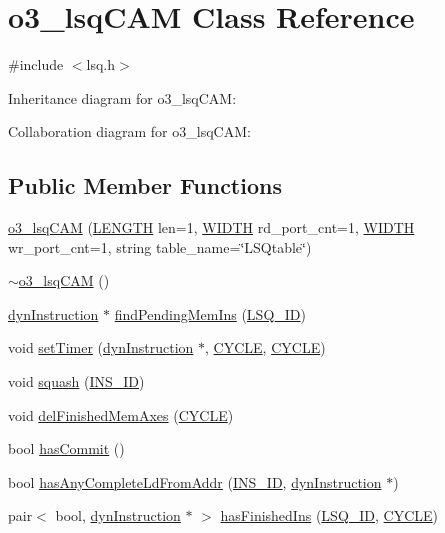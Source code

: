 \hypertarget{classo3__lsqCAM}{
\section{o3\_\-lsqCAM Class Reference}
\label{classo3__lsqCAM}
}


{\ttfamily \#include $<$lsq.h$>$}



Inheritance diagram for o3\_\-lsqCAM:


Collaboration diagram for o3\_\-lsqCAM:
\subsection*{Public Member Functions}
\begin{DoxyCompactItemize}
\item 
\hyperlink{classo3__lsqCAM_a834f3e822c9d236ae72c40316f43b693}{o3\_\-lsqCAM} (\hyperlink{global_2global_8h_ad7ec63c69447a2b630929c8e0197860d}{LENGTH} len=1, \hyperlink{global_2global_8h_a6fa2e24b8a418fa215e183264cbea3aa}{WIDTH} rd\_\-port\_\-cnt=1, \hyperlink{global_2global_8h_a6fa2e24b8a418fa215e183264cbea3aa}{WIDTH} wr\_\-port\_\-cnt=1, string table\_\-name=\char`\"{}LSQtable\char`\"{})
\item 
\hyperlink{classo3__lsqCAM_a5bc53f5f972f4d902325bc702efe8491}{$\sim$o3\_\-lsqCAM} ()
\item 
\hyperlink{classdynInstruction}{dynInstruction} $\ast$ \hyperlink{classo3__lsqCAM_a7db68789c8d9af13bbc9ec485b4972bc}{findPendingMemIns} (\hyperlink{o3_2lsq_8h_a3bb5a7f1114a20672e012bf0dfe5fb24}{LSQ\_\-ID})
\item 
void \hyperlink{classo3__lsqCAM_a12159149dc0b13cda6edfb1213ce6197}{setTimer} (\hyperlink{classdynInstruction}{dynInstruction} $\ast$, \hyperlink{global_2global_8h_a7e19a550ec11d1ed921deb20c22efb5b}{CYCLE}, \hyperlink{global_2global_8h_a7e19a550ec11d1ed921deb20c22efb5b}{CYCLE})
\item 
void \hyperlink{classo3__lsqCAM_a95e286b95f3651e40d57206eb2a41308}{squash} (\hyperlink{global_2global_8h_a1883c47d0023d0f200e1d86eced6a070}{INS\_\-ID})
\item 
void \hyperlink{classo3__lsqCAM_a2aa5dc2ccb76d85e0c8df59a8dfe47f2}{delFinishedMemAxes} (\hyperlink{global_2global_8h_a7e19a550ec11d1ed921deb20c22efb5b}{CYCLE})
\item 
bool \hyperlink{classo3__lsqCAM_ad3d6f79a7377317fc859080d337d428a}{hasCommit} ()
\item 
bool \hyperlink{classo3__lsqCAM_ac3fca99875017c6639bfeccafe904c83}{hasAnyCompleteLdFromAddr} (\hyperlink{global_2global_8h_a1883c47d0023d0f200e1d86eced6a070}{INS\_\-ID}, \hyperlink{classdynInstruction}{dynInstruction} $\ast$)
\item 
pair$<$ bool, \hyperlink{classdynInstruction}{dynInstruction} $\ast$ $>$ \hyperlink{classo3__lsqCAM_aad5ca9d9f84c657635d39de62e1ec32a}{hasFinishedIns} (\hyperlink{o3_2lsq_8h_a3bb5a7f1114a20672e012bf0dfe5fb24}{LSQ\_\-ID}, \hyperlink{global_2global_8h_a7e19a550ec11d1ed921deb20c22efb5b}{CYCLE})
\end{DoxyCompactItemize}


